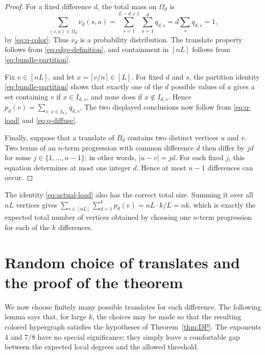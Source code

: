 \documentclass[10pt,a4paper]{amsart}
\numberwithin{equation}{section}
\begin{document}
\begin{proof}
For a fixed difference $d$, the total mass on $\Omega_d$ is
\[
        \sum_{(s,a)\in\Omega_d}\nu_d(s,a)
        =\sum_{s=1}^{L-d+1}\sum_{a=1}^d q_{d,s}
        =d\sum_s q_{d,s}=1,
\]
by \eqref{eq:q-color}.  Thus $\nu_d$ is a probability distribution.  The
translate property follows from \eqref{eq:edge-definition}, and containment in
$[nL]$ follows from \eqref{eq:bundle-partition}.

Fix $v\in[nL]$, and let $x=\lceil v/n\rceil\in[L]$.  For fixed $d$ and $s$,
the partition identity \eqref{eq:bundle-partition} shows that exactly one of
the $d$ possible values of $a$ gives a set containing $v$ if $x\in I_{d,s}$,
and none does if $x\notin I_{d,s}$.  Hence $p_d(v)=\sum_{s:\,x\in I_{d,s}}q_{d,s}$.
The two displayed conclusions now follow from \eqref{eq:q-load} and
\eqref{eq:q-diffuse}.

Finally, suppose that a translate of $B_d$ contains two distinct vertices $u$
and $v$.  Two terms of an $n$-term progression with common difference $d$ then
differ by $jd$ for some $j\in\{1,\ldots,n-1\}$; in other words,
$|u-v|=jd$.  For each fixed $j$, this equation determines at most one integer
$d$.  Hence at most $n-1$ differences can occur.
\end{proof}

The identity \eqref{eq:actual-load} also has the correct total size.  Summing
it over all $nL$ vertices gives
$\sum_{v\in[nL]}\sum_{d=1}^k p_d(v)=nL\cdot k/L=nk$, which is exactly the
expected total number of vertices obtained by choosing one $n$-term progression
for each of the $k$ differences.

\section{Random choice of translates and the proof of the theorem}

We now choose finitely many possible translates for each difference.  The
following lemma says that, for large $k$, the choices may be made so that the
resulting colored hypergraph satisfies the hypotheses of Theorem~\ref{thm:DP}.
The exponents $4$ and $7/8$ have no special significance; they simply leave a
comfortable gap between the expected local degrees and the allowed threshold.
\end{document}
